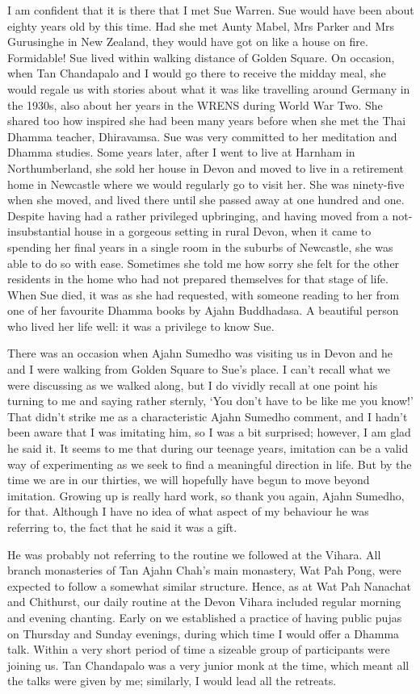 I am confident that it is there that I met Sue Warren. Sue would have
been about eighty years old by this time. Had she met Aunty Mabel, Mrs
Parker and Mrs Gurusinghe in New Zealand, they would have got on like a
house on fire. Formidable! Sue lived within walking distance of Golden
Square. On occasion, when Tan Chandapalo and I would go there to receive
the midday meal, she would regale us with stories about what it was like
travelling around Germany in the 1930s, also about her years in the WRENS\cite{wrens}
during World War Two. She shared too how inspired she had been
many years before when she met the Thai Dhamma teacher, Dhiravamsa. Sue
was very committed to her meditation and Dhamma studies. Some years
later, after I went to live at Harnham in Northumberland, she sold her
house in Devon and moved to live in a retirement home in Newcastle where
we would regularly go to visit her. She was ninety-five when she moved,
and lived there until she passed away at one hundred and one. Despite
having had a rather privileged upbringing, and having moved from a
not-insubstantial house in a gorgeous setting in rural Devon, when it
came to spending her final years in a single room in the suburbs of
Newcastle, she was able to do so with ease. Sometimes she told me how
sorry she felt for the other residents in the home who had not prepared
themselves for that stage of life. When Sue died, it was as she had
requested, with someone reading to her from one of her favourite Dhamma
books by Ajahn Buddhadasa. A beautiful person who lived her life well:
it was a privilege to know Sue.

There was an occasion when Ajahn Sumedho was visiting us in Devon and he
and I were walking from Golden Square to Sue's place. I can't recall
what we were discussing as we walked along, but I do vividly recall at
one point his turning to me and saying rather sternly, `You don't have
to be like me you know!' That didn't strike me as a
characteristic Ajahn Sumedho comment, and I hadn't been aware that I was
imitating him, so I was a bit surprised; however, I am glad he said it.
It seems to me that during our teenage years, imitation can be a valid
way of experimenting as we seek to find a meaningful direction in life.
But by the time we are in our thirties, we will hopefully have begun to
move beyond imitation. Growing up is really hard work, so thank you
again, Ajahn Sumedho, for that. Although I have no idea of what aspect
of my behaviour he was referring to, the fact that he said it was a
gift.

He was probably not referring to the routine we followed at the Vihara.
All branch monasteries of Tan Ajahn Chah's main monastery, Wat Pah Pong,
were expected to follow a somewhat similar structure. Hence, as at Wat
Pah Nanachat and Chithurst, our daily routine at the Devon Vihara
included regular morning and evening chanting. Early on we established a
practice of having public pujas on Thursday and Sunday evenings, during
which time I would offer a Dhamma talk. Within a very short period of
time a sizeable group of participants were joining us. Tan Chandapalo
was a very junior monk at the time, which meant all the talks were given
by me; similarly, I would lead all the retreats.

